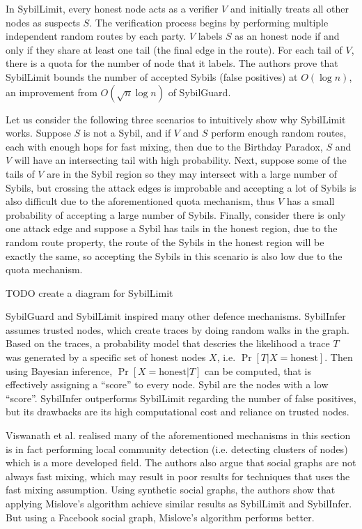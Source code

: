 In SybilLimit, every honest node acts as a verifier $V$ and initially treats all
other nodes as suspects $S$. The verification process begins by performing
multiple independent random routes by each party. $V$ labels $S$ as an honest
node if and only if they share at least one tail (the final edge in the route).
For each tail of $V$, there is a quota for the number of node that it labels.
The authors prove that SybilLimit bounds the number of accepted Sybils (false
positives) at $O(\log{n})$, an improvement from $O(\sqrt{n} \log{n})$ of
SybilGuard.

Let us consider the following three scenarios to intuitively show why SybilLimit
works. Suppose $S$ is not a Sybil, and if $V$ and $S$ perform enough random
routes, each with enough hops for fast mixing, then due to the Birthday Paradox,
$S$ and $V$ will have an intersecting tail with high probability. Next, suppose
some of the tails of $V$ are in the Sybil region so they may intersect with a
large number of Sybils, but crossing the attack edges is improbable and
accepting a lot of Sybils is also difficult due to the aforementioned quota
mechanism, thus $V$ has a small probability of accepting a large number of
Sybils. Finally, consider there is only one attack edge and suppose a Sybil has
tails in the honest region, due to the random route property, the route of the
Sybils in the honest region will be exactly the same, so accepting the Sybils in
this scenario is also low due to the quota mechanism.

TODO create a diagram for SybilLimit

SybilGuard and SybilLimit inspired many other defence mechanisms.
SybilInfer\cite{danezis2009sybilinfer} assumes trusted nodes, which create
traces by doing random walks in the graph. Based on the traces, a probability
model that descries the likelihood a trace $T$ was generated by a specific set
of honest nodes $X$, i.e. $\Pr[ T | X = \text{honest}]$. Then using Bayesian
inference, $\Pr[ X = \text{honest}| T ]$ can be computed, that is effectively
assigning a ``score'' to every node. Sybil are the nodes with a low ``score''.
SybilInfer outperforms SybilLimit regarding the number of false positives, but
its drawbacks are its high computational cost and reliance on trusted nodes.

Viswanath et al. realised many of the aforementioned mechanisms in this section
is in fact performing local community detection (i.e. detecting clusters of
nodes) which is a more developed field\cite{viswanath2010analysis}. The authors
also argue that social graphs are not always fast mixing, which may result in
poor results for techniques that uses the fast mixing assumption. Using
synthetic social graphs, the authors show that applying Mislove's
algorithm\cite{mislove2010you} achieve similar results as SybilLimit and
SybilInfer. But using a Facebook social graph, Mislove's algorithm performs
better.

